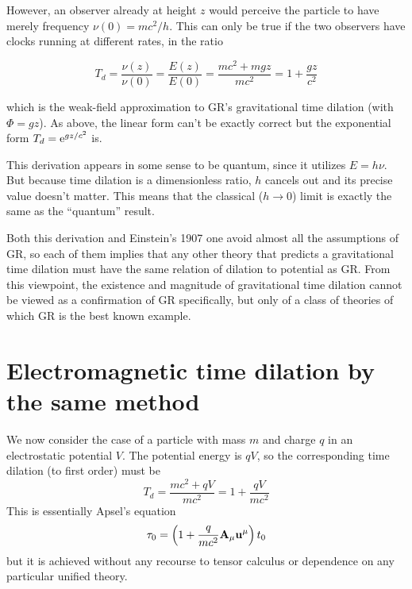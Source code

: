 However, an observer already at height $z$ would perceive the particle to have merely frequency $\nu(0) = mc^2/h$. This can only be true if the two observers have clocks running at different rates, in the ratio

\begin{equation}
T_d = \frac{\nu(z)}{\nu(0)} = \frac{E(z)}{E(0)} = \frac{mc^2 + mgz}{mc^2} = 1 + \frac{gz}{c^2}
\end{equation}

\noindent which is the weak-field approximation to GR's gravitational time dilation
(with $\Phi = gz$).
As above, the linear form can't be exactly correct but the exponential form
$T_d = {\rm e}^{gz/c^2}$ is.

This derivation appears in some sense to be quantum, since it utilizes $E = h\nu$.
But because time dilation is a dimensionless ratio, $h$ cancels out and its precise value doesn't matter.
This means that the classical ($h \to 0$) limit is exactly the same as the ``quantum'' result.

Both this derivation and Einstein's 1907 one avoid almost all the assumptions of GR,
so each of them implies that any other theory that predicts a gravitational time dilation
must have the same relation of dilation to potential as GR.
From this viewpoint, the existence and magnitude of gravitational time dilation
cannot be viewed as a confirmation of GR specifically,
but only of a class of theories of which GR is the best known example.


\section{Electromagnetic time dilation by the same method}
\label{sec:4}

We now consider the case of a particle with mass $m$ and charge $q$ in an electrostatic potential $V$.
The potential energy is $qV$, so the corresponding time dilation (to first order) must be
\begin{equation}
T_d =  \frac{mc^2 + qV}{mc^2} =  1 + \frac{qV}{mc^2}
\end{equation}
This is essentially Apsel's equation \cite{Apsel1979}
\begin{equation}
\tau_0 =  \left(1 + \frac{q}{mc^2} {\bf A}_\mu {\bf u}^\mu \right) t_0
\end{equation}
but it is achieved without any recourse to tensor calculus
or dependence on any particular unified theory.

